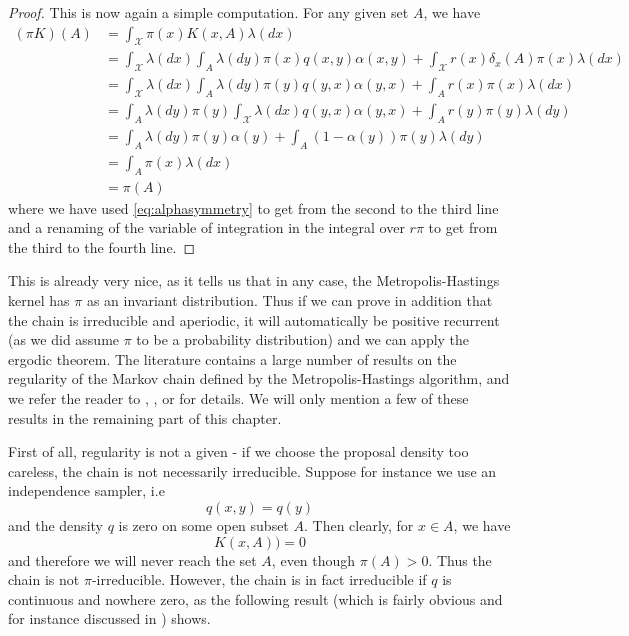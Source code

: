 \documentclass[a4paper, draft]{article}
\theoremstyle{own}
\theoremstyle{remark}
\begin{document}
\begin{proof}
	This is now again a simple computation. For any given set $A$, we have
	\begin{align*}
	(\pi K)(A) &= \int_{\mathcal X} \pi(x) K(x,A) \lambda(dx) \\
	&= \int_{\mathcal X} \lambda(dx) \int_A \lambda(dy) \pi(x)  q(x,y) \alpha(x,y)  + \int_{\mathcal X} r(x) \delta_x(A) \pi(x) \lambda(dx) \\
	&= \int_{\mathcal X} \lambda(dx) \int_A \lambda(dy) \pi(y)  q(y,x) \alpha(y,x)  + \int_{A} r(x)\pi(x) \lambda(dx) \\
	&=  \int_{A} \lambda(dy) \pi(y) \int_{\mathcal X} \lambda(dx)   q(y,x) \alpha(y,x)  + \int_{A} r(y)\pi(y) \lambda(dy) \\
	&= \int_{A} \lambda(dy) \pi(y) \alpha(y)
	+ \int_{A} (1-\alpha(y))\pi(y) \lambda(dy) \\
	& = \int_A \pi(x) \lambda(dx) \\
	&= \pi(A)
	\end{align*}
	where we have used \eqref{eq:alphasymmetry} to get from the second to the third line and a renaming of the variable of integration in the integral over $r \pi $ to get from the third to
	the fourth line. 
\end{proof}

This is already very nice, as it tells us that in any case, the Metropolis-Hastings kernel has $\pi$ as an invariant distribution. Thus if we can prove in addition that the chain is irreducible and aperiodic, it will automatically be positive recurrent (as we did assume $\pi$ to be a probability distribution) and we can apply the ergodic theorem. The literature contains a large number of results on the regularity of the Markov chain defined by the Metropolis-Hastings algorithm, and we refer the reader to \cite{Tierney1994}, \cite{RobertsTweedie1996}, \cite{RobertsRosenthal2006} or \cite{RobertCasella1999} for details. We will only mention a few of these results in the remaining part of this chapter.

First of all, regularity is not a given - if we choose the proposal density too careless, the chain is not necessarily irreducible. Suppose for instance we use an independence sampler, i.e
$$
q(x,y) = q(y)
$$
and the density $q$ is zero on some open subset $A$. Then clearly, for $x \in A$, we have
$$
K(x,A)) = 0
$$
and therefore we will never reach the set $A$, even though $\pi(A) > 0$. Thus the chain is not $\pi$-irreducible. However, the chain is in fact irreducible if $q$ is continuous and nowhere zero, as the following result (which is fairly obvious and for instance discussed in \cite{Tierney1994}) shows.
\end{document}
